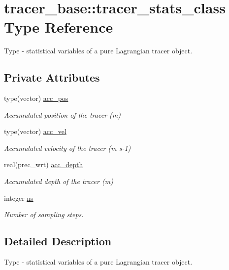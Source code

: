 \hypertarget{structtracer__base_1_1tracer__stats__class}{}\section{tracer\+\_\+base\+:\+:tracer\+\_\+stats\+\_\+class Type Reference}
\label{structtracer__base_1_1tracer__stats__class}


Type -\/ statistical variables of a pure Lagrangian tracer object.  


\subsection*{Private Attributes}
\begin{DoxyCompactItemize}
\item 
type(vector) \mbox{\hyperlink{structtracer__base_1_1tracer__stats__class_ae01f6d724c6a81e28d959571187e5949}{acc\+\_\+pos}}
\begin{DoxyCompactList}\small\item\em Accumulated position of the tracer (m) \end{DoxyCompactList}\item 
type(vector) \mbox{\hyperlink{structtracer__base_1_1tracer__stats__class_af5c29fc910469ddabe6e549a3743c310}{acc\+\_\+vel}}
\begin{DoxyCompactList}\small\item\em Accumulated velocity of the tracer (m s-\/1) \end{DoxyCompactList}\item 
real(prec\+\_\+wrt) \mbox{\hyperlink{structtracer__base_1_1tracer__stats__class_a33ecd4e2ae6ac454806fc383dbc0855a}{acc\+\_\+depth}}
\begin{DoxyCompactList}\small\item\em Accumulated depth of the tracer (m) \end{DoxyCompactList}\item 
integer \mbox{\hyperlink{structtracer__base_1_1tracer__stats__class_a77e72ef1bc36c7b337f2d1b199010e81}{ns}}
\begin{DoxyCompactList}\small\item\em Number of sampling steps. \end{DoxyCompactList}\end{DoxyCompactItemize}


\subsection{Detailed Description}
Type -\/ statistical variables of a pure Lagrangian tracer object. 

